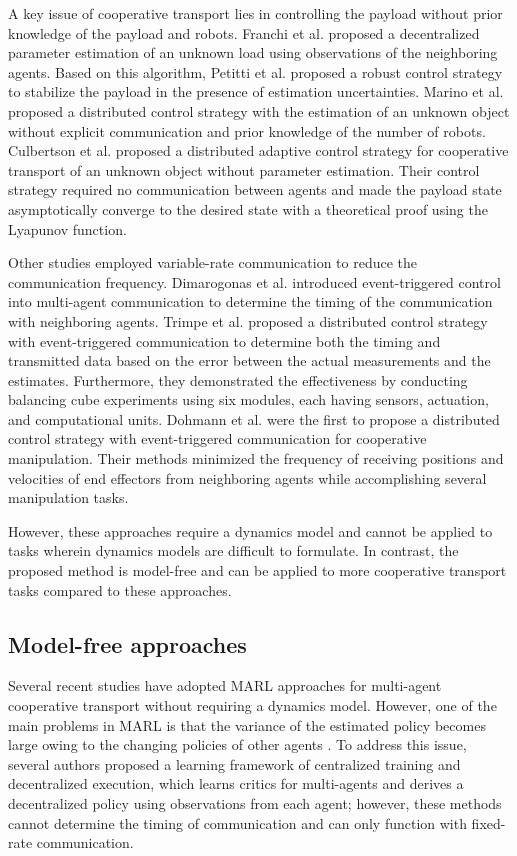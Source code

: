 \documentclass[letterpaper, 10 pt, conference]{ieeeconf} %
\begin{document}
A key issue of cooperative transport lies in controlling the payload without prior knowledge of the payload and robots.
Franchi et al. \cite{Franchi2014, Franchi2015} proposed a decentralized parameter estimation of an unknown load using observations of the neighboring agents.
Based on this algorithm, Petitti et al. \cite{Petitti2016} proposed a robust control strategy to stabilize the payload in the presence of estimation uncertainties. 
Marino et al. \cite{Marino2018} proposed a distributed control strategy with the estimation of an unknown object without explicit communication and prior knowledge of the number of robots.
Culbertson et al. \cite{Culbertson2018} proposed a distributed adaptive control strategy for cooperative transport of an unknown object without parameter estimation.
Their control strategy required no communication between agents and made the payload state asymptotically converge to the desired state with a theoretical proof using the Lyapunov function.

Other studies employed variable-rate communication to reduce the communication frequency.
Dimarogonas et al. \cite{Dimarogonas2012} introduced event-triggered control \cite{Heemels2012, Miskowicz2016} into multi-agent communication to determine the timing of the communication with neighboring agents.
Trimpe et al. \cite{Trimpe2011} proposed a distributed control strategy with event-triggered communication to determine both the timing and transmitted data based on the error between the actual measurements and the estimates.
Furthermore, they demonstrated the effectiveness by conducting balancing cube experiments using six modules, each having sensors, actuation, and computational units.
Dohmann et al. \cite{Dohmann2020} were the first to propose a distributed control strategy with event-triggered communication for cooperative manipulation. Their methods minimized the frequency of receiving positions and velocities of end effectors from neighboring agents while accomplishing several manipulation tasks.

However, these approaches require a dynamics model and cannot be applied to tasks wherein dynamics models are difficult to formulate. In contrast, the proposed method is model-free and can be applied to more cooperative transport tasks compared to these approaches.

\subsection{Model-free approaches}
Several recent studies \cite{Rahimi2018, Miyazaki2021, Niwa2021} have adopted MARL approaches for multi-agent cooperative transport without requiring a dynamics model.
However, one of the main problems in MARL is that the variance of the estimated policy becomes large owing to the changing policies of other agents \cite{Hernandez2019}.
To address this issue, several authors \cite{Lowe2017, Foerster2018} proposed a learning framework of centralized training and decentralized execution, which learns critics for multi-agents and derives a decentralized policy using observations from each agent;
however, these methods cannot determine the timing of communication and can only function with fixed-rate communication.
\end{document}
